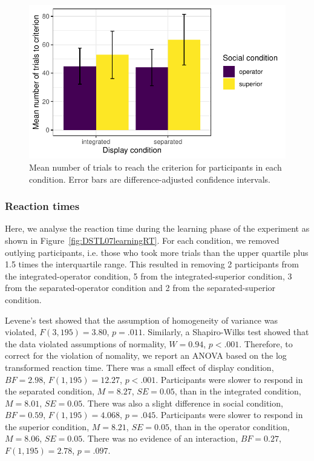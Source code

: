 \documentclass[doc, a4paper, apacite]{apa6}
\begin{document}
\begin{figure}
	\centering
	\includegraphics{images/DSTL07trialsCriterion}
	\caption{Mean number of trials to reach the criterion for participants in each condition. Error bars are difference-adjusted confidence intervals.}
	\label{fig:DSTL07trialsCriterion}
\end{figure}

\subsubsection{Reaction times}
Here, we analyse the reaction time during the learning phase of the experiment as shown in Figure~\ref{fig:DSTL07learningRT}. 
For each condition, we removed outlying participants, i.e. those who took more trials than the upper quartile plus 1.5 times the interquartile range. 
This resulted in removing 2 participants from the integrated-operator condition, 5 from the integrated-superior condition, 3 from the separated-operator condition and 2 from the separated-superior condition. 

Levene's test showed that the assumption of homogeneity of variance was violated, $F(3, 195)=3.80$, $p=.011$. 
Similarly, a Shapiro-Wilks test showed that the data violated assumptions of normality, $W=0.94$, $p<.001$. 
Therefore, to correct for the violation of nomality, we report an ANOVA based on the log transformed reaction time. 
There was a small effect of display condition, $BF=2.98$, $F(1, 195)=12.27$, $p<.001$.
Participants were slower to respond in the separated condition, $M=8.27$, $SE=0.05$, than in the integrated condition, $M=8.01$, $SE=0.05$. 
There was also a slight difference in social condition, $BF=0.59$, $F(1, 195)=4.068$, $p=.045$. 
Participants were slower to respond in the superior condition, $M=8.21$, $SE=0.05$, than in the operator condition, $M=8.06$, $SE=0.05$. 
There was no evidence of an interaction, $BF=0.27$, $F(1, 195)=2.78$, $p=.097$. 
\end{document}
